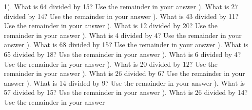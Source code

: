 \documentclass{article}%
\begin{document}
1). What is 64 divided by 15? Use the remainder in your answer%
\newline%
\newline%
). What is 27 divided by 14? Use the remainder in your answer%
\newline%
\newline%
). What is 43 divided by 11? Use the remainder in your answer%
\newline%
\newline%
). What is 12 divided by 20? Use the remainder in your answer%
\newline%
\newline%
). What is 4 divided by 4? Use the remainder in your answer%
\newline%
\newline%
). What is 68 divided by 15? Use the remainder in your answer%
\newline%
\newline%
). What is 65 divided by 18? Use the remainder in your answer%
\newline%
\newline%
). What is 6 divided by 4? Use the remainder in your answer%
\newline%
\newline%
). What is 20 divided by 12? Use the remainder in your answer%
\newline%
\newline%
). What is 26 divided by 6? Use the remainder in your answer%
\newline%
\newline%
). What is 14 divided by 9? Use the remainder in your answer%
\newline%
\newline%
). What is 57 divided by 15? Use the remainder in your answer%
\newline%
\newline%
). What is 26 divided by 14? Use the remainder in your answer%
\end{document}
